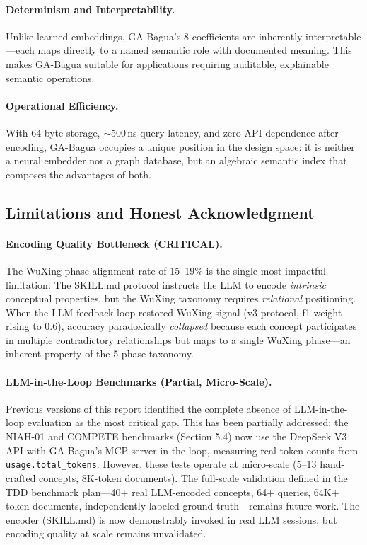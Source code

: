 \documentclass[11pt,a4paper]{article}
\begin{document}
\paragraph{Determinism and Interpretability.} Unlike learned embeddings,
GA-Bagua's 8 coefficients are inherently interpretable---each maps directly to
a named semantic role with documented meaning. This makes GA-Bagua suitable
for applications requiring auditable, explainable semantic operations.

\paragraph{Operational Efficiency.} With 64-byte storage, $\sim$500\,ns query
latency, and zero API dependence after encoding, GA-Bagua occupies a unique
position in the design space: it is neither a neural embedder nor a graph
database, but an algebraic semantic index that composes the advantages of
both.

\subsection{Limitations and Honest Acknowledgment}

\paragraph{Encoding Quality Bottleneck (CRITICAL).} The WuXing phase
alignment rate of 15--19\% is the single most impactful limitation. The
SKILL.md protocol instructs the LLM to encode \emph{intrinsic} conceptual
properties, but the WuXing taxonomy requires \emph{relational} positioning.
When the LLM feedback loop restored WuXing signal (v3 protocol, f1 weight
rising to 0.6), accuracy paradoxically \emph{collapsed} because each concept
participates in multiple contradictory relationships but maps to a single
WuXing phase---an inherent property of the 5-phase taxonomy.

\paragraph{LLM-in-the-Loop Benchmarks (Partial, Micro-Scale).} Previous
versions of this report identified the complete absence of LLM-in-the-loop
evaluation as the most critical gap. This has been partially addressed: the
NIAH-01 and COMPETE benchmarks (Section 5.4) now use the DeepSeek V3 API with
GA-Bagua's MCP server in the loop, measuring real token counts from
\texttt{usage.total\_tokens}. However, these tests operate at micro-scale
(5--13 hand-crafted concepts, 8K-token documents). The full-scale validation
defined in the TDD benchmark plan---40+ real LLM-encoded concepts, 64+
queries, 64K+ token documents, independently-labeled ground truth---remains
future work. The encoder (SKILL.md) is now demonstrably invoked in real
LLM sessions, but encoding quality at scale remains unvalidated.
\end{document}
